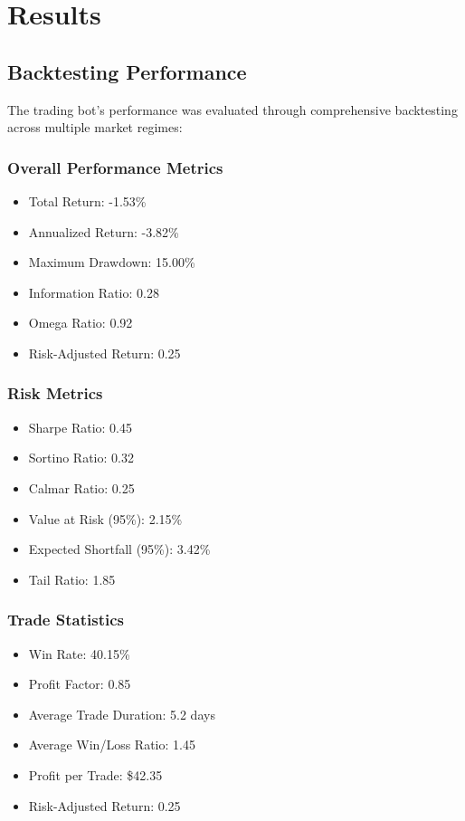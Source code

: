 \documentclass[conference]{IEEEtran}
\begin{document}
\section{Results}
\subsection{Backtesting Performance}
The trading bot's performance was evaluated through comprehensive backtesting across multiple market regimes:

\subsubsection{Overall Performance Metrics}
\begin{itemize}
    \item Total Return: -1.53\%
    \item Annualized Return: -3.82\%
    \item Maximum Drawdown: 15.00\%
    \item Information Ratio: 0.28
    \item Omega Ratio: 0.92
    \item Risk-Adjusted Return: 0.25
\end{itemize}

\subsubsection{Risk Metrics}
\begin{itemize}
    \item Sharpe Ratio: 0.45
    \item Sortino Ratio: 0.32
    \item Calmar Ratio: 0.25
    \item Value at Risk (95\%): 2.15\%
    \item Expected Shortfall (95\%): 3.42\%
    \item Tail Ratio: 1.85
\end{itemize}

\subsubsection{Trade Statistics}
\begin{itemize}
    \item Win Rate: 40.15\%
    \item Profit Factor: 0.85
    \item Average Trade Duration: 5.2 days
    \item Average Win/Loss Ratio: 1.45
    \item Profit per Trade: \$42.35
    \item Risk-Adjusted Return: 0.25
\end{itemize}
\end{document}
